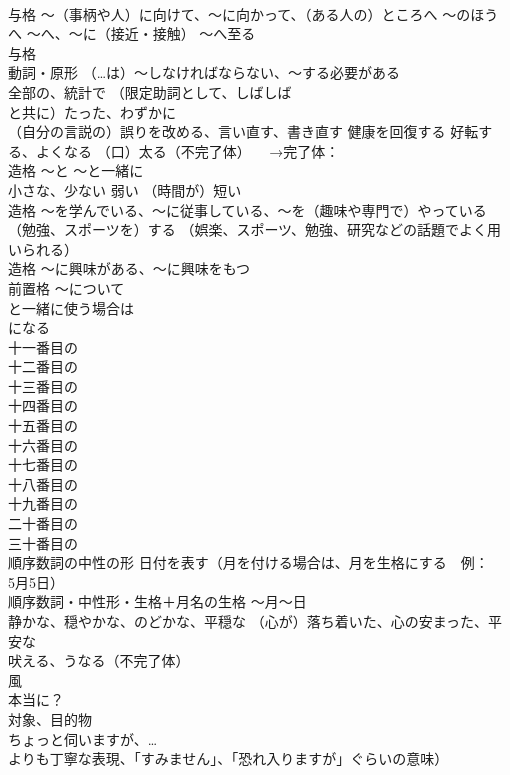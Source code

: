 \documentclass[8pt]{extreport}
\begin{document}
\begin{CJK}{UTF8}{min}
\\	与格	～（事柄や人）に向けて、～に向かって、（ある人の）ところへ ～のほうへ 〜へ、〜に（接近・接触） 〜へ至る
\\	与格 
\\	動詞・原形	（…は）～しなければならない、〜する必要がある
\\	全部の、統計で （限定助詞として、しばしば
\\	と共に）たった、わずかに
\\	（自分の言説の）誤りを改める、言い直す、書き直す 健康を回復する 好転する、よくなる （口）太る（不完了体） 　→完了体：
\\	造格	～と ～と一緒に
\\	小さな、少ない 弱い （時間が）短い
\\	造格	～を学んでいる、〜に従事している、〜を（趣味や専門で）やっている （勉強、スポーツを）する （娯楽、スポーツ、勉強、研究などの話題でよく用いられる）
\\	造格	～に興味がある、～に興味をもつ
\\	前置格	～について 
\\	と一緒に使う場合は
\\	になる
\\	[序]十一番目の
\\	[序]十二番目の
\\	[序]十三番目の
\\	[序]十四番目の
\\	[序]十五番目の
\\	[序]十六番目の
\\	[序]十七番目の
\\	[序]十八番目の
\\	[序]十九番目の
\\	[序]二十番目の
\\	[序]三十番目の
\\	順序数詞の中性の形	日付を表す（月を付ける場合は、月を生格にする　例：
\\	5月5日）
\\	順序数詞・中性形・生格＋月名の生格	～月～日
\\	静かな、穏やかな、のどかな、平穏な （心が）落ち着いた、心の安まった、平安な
\\	吠える、うなる（不完了体） 
\\	風
\\	本当に？
\\	対象、目的物
\\	ちょっと伺いますが、… 
\\	よりも丁寧な表現、「すみません」、「恐れ入りますが」ぐらいの意味）

\end{CJK}
\end{document}
